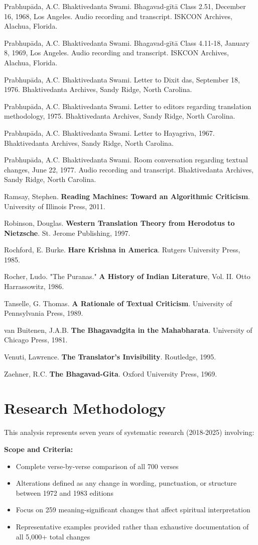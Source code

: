 \documentclass[11pt,twoside]{book}
\begin{document}
Prabhupāda, A.C. Bhaktivedanta Swami. Bhagavad-gītā Class 2.51, December 16, 1968, Los Angeles. Audio recording and transcript. ISKCON Archives, Alachua, Florida.

Prabhupāda, A.C. Bhaktivedanta Swami. Bhagavad-gītā Class 4.11-18, January 8, 1969, Los Angeles. Audio recording and transcript. ISKCON Archives, Alachua, Florida.

Prabhupāda, A.C. Bhaktivedanta Swami. Letter to Dixit das, September 18, 1976. Bhaktivedanta Archives, Sandy Ridge, North Carolina.

Prabhupāda, A.C. Bhaktivedanta Swami. Letter to editors regarding translation methodology, 1975. Bhaktivedanta Archives, Sandy Ridge, North Carolina.

Prabhupāda, A.C. Bhaktivedanta Swami. Letter to Hayagriva, 1967. Bhaktivedanta Archives, Sandy Ridge, North Carolina.

Prabhupāda, A.C. Bhaktivedanta Swami. Room conversation regarding textual changes, June 22, 1977. Audio recording and transcript. Bhaktivedanta Archives, Sandy Ridge, North Carolina.

Ramsay, Stephen. \textbf{Reading Machines: Toward an Algorithmic Criticism}. University of Illinois Press, 2011.

Robinson, Douglas. \textbf{Western Translation Theory from Herodotus to Nietzsche}. St. Jerome Publishing, 1997.

Rochford, E. Burke. \textbf{Hare Krishna in America}. Rutgers University Press, 1985.

Rocher, Ludo. "The Puranas." \textbf{A History of Indian Literature}, Vol. II. Otto Harrassowitz, 1986.

Tanselle, G. Thomas. \textbf{A Rationale of Textual Criticism}. University of Pennsylvania Press, 1989.

van Buitenen, J.A.B. \textbf{The Bhagavadgita in the Mahabharata}. University of Chicago Press, 1981.

Venuti, Lawrence. \textbf{The Translator's Invisibility}. Routledge, 1995.

Zaehner, R.C. \textbf{The Bhagavad-Gita}. Oxford University Press, 1969.
\section*{Research Methodology}
\label{sec:org7c7250e}

This analysis represents seven years of systematic research (2018-2025) involving:

\textbf{\textbf{Scope and Criteria:}}
\begin{itemize}
\item Complete verse-by-verse comparison of all 700 verses
\item Alterations defined as any change in wording, punctuation, or structure between 1972 and 1983 editions
\item Focus on 259 meaning-significant changes that affect spiritual interpretation
\item Representative examples provided rather than exhaustive documentation of all 5,000+ total changes
\end{itemize}
\end{document}
